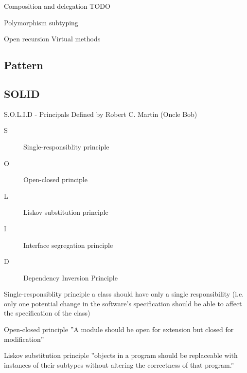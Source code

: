 \documentclass{beamer}
\begin{document}
\begin{frame}{Composition and delegation}
TODO
\end{frame}

\begin{frame}{Polymorphism}
subtyping
\end{frame}

\begin{frame}{Open recursion}
Virtual methods




\end{frame}


\subsection{Pattern}



\subsection{SOLID}

\begin{frame}{S.O.L.I.D - Principals}
Defined by Robert C. Martin (Oncle Bob)


\begin{description}
\item [S] Single-responsiblity principle
\item [O] Open-closed principle
\item [L] Liskov substitution principle
\item [I] Interface segregation principle
\item [D] Dependency Inversion Principle
\end{description}
\end{frame}

\begin{frame}{Single-responsiblity principle}
a class should have only a single responsibility (i.e. only one potential change
in the software's specification should be able to affect the specification of the class)
\end{frame}

\begin{frame}{Open-closed principle}
''A module should be open for extension but closed for modification''
\end{frame}

\begin{frame}{Liskov substitution principle}
''objects in a program should be replaceable with instances of their subtypes
without altering the correctness of that program.''
\end{frame}
\end{document}
